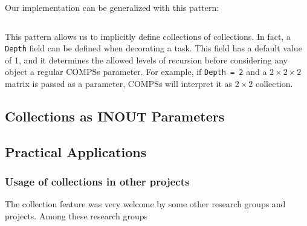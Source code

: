 Our implementation can be generalized with this pattern:

\inputminted{python}{snippets/collection_pattern.py}

This pattern allows us to implicitly define collections of collections. In fact, a \verb|Depth| field can be defined when decorating a task. This field has a default value of 1, and it determines the allowed levels of recursion before considering any object a regular COMPSs parameter. For example, if \verb|Depth = 2| and a $2 \times 2 \times 2$ matrix is passed as a parameter, COMPSs will interpret it as $2 \times 2$ collection.

\subsection{Collections as INOUT Parameters}
\label{subsec:col_inout}


\subsection{Practical Applications}
\label{subsec:col_examples}

\subsubsection{Usage of collections in other projects}
\label{subsubsec:col_projects}
The collection feature was very welcome by some other research groups and projects. Among these research groups 